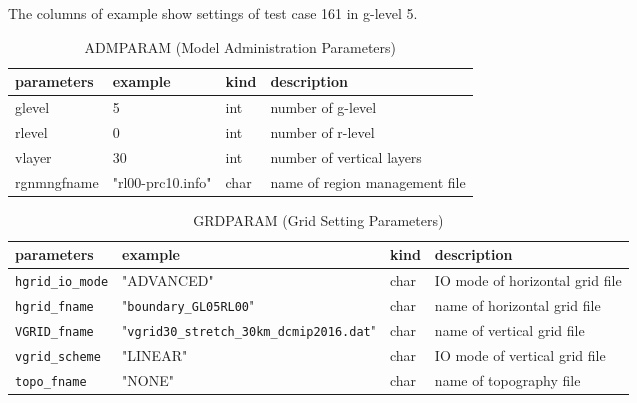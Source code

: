 
The columns of example show settings of test case 161 in g-level 5.

\begin{table}[htb]
\begin{center}
\caption{ADMPARAM (Model Administration Parameters)}
\begin{tabularx}{150mm}{|l|l|l|X|} \hline
 \rowcolor[gray]{0.9} parameters & example & kind & description          \\ \hline
 glevel      & 5                 & int  & number of g-level              \\ \hline
 rlevel      & 0                 & int  & number of r-level              \\ \hline
 vlayer      & 30                & int  & number of vertical layers      \\ \hline
 rgnmngfname & "rl00-prc10.info" & char & name of region management file \\ \hline
\end{tabularx}
\end{center}
\end{table}

\begin{table}[htb]
\begin{center}
\caption{GRDPARAM (Grid Setting Parameters)}
\begin{tabularx}{150mm}{|l|l|l|X|} \hline
 \rowcolor[gray]{0.9} parameters & example & kind & description      \\ \hline
 \verb|hgrid_io_mode| & "ADVANCED" & char & IO mode of horizontal grid file \\ \hline
 \verb|hgrid_fname|   & "\verb|boundary_GL05RL00|"                  & char & name of horizontal grid file \\ \hline
 \verb|VGRID_fname|   & "\verb|vgrid30_stretch_30km_dcmip2016.dat|" & char & name of vertical grid file \\ \hline
 \verb|vgrid_scheme|  & "LINEAR"   & char & IO mode of vertical grid file   \\ \hline
 \verb|topo_fname|    & "NONE"     & char & name of topography file         \\ \hline
\end{tabularx}
\end{center}
\end{table}

